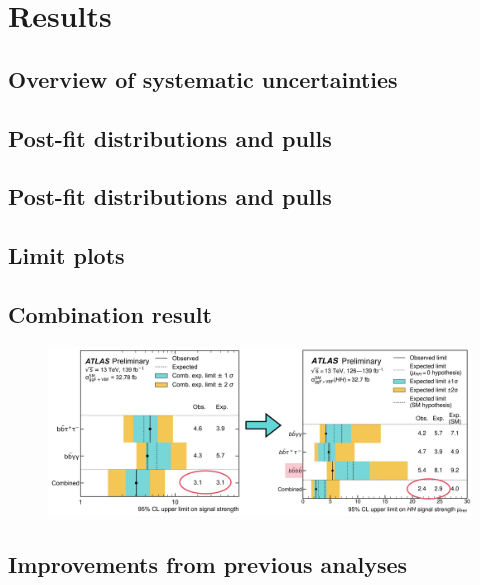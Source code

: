 \chapter{Results}

\section{Overview of systematic uncertainties}

\section{Post-fit distributions and pulls}

\section{Post-fit distributions and pulls}

\section{Limit plots}

\section{Combination result}

\begin{figure}
    \centering
    \includegraphics[width=\textwidth]{figures/my_dihiggs/4b-nr-comb.png}
    \caption{\cite{ATLAS-CONF-2021-052} \cite{ATLAS-CONF-2022-050}}
    \label{fig:nr-sm-comb}
\end{figure}



\section{Improvements from previous analyses}
